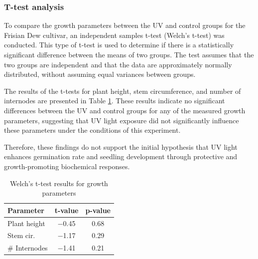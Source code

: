 \subsubsection{T-test analysis}

To compare the growth parameters between the UV and control groups for the Frisian Dew cultivar, an independent samples t-test (Welch's t-test) was conducted. This type of t-test is used to determine if there is a statistically significant difference between the means of two groups. The test assumes that the two groups are independent and that the data are approximately normally distributed, without assuming equal variances between groups.

The results of the t-tests for plant height, stem circumference, and number of internodes are presented in Table \ref{tab:ttest_results}. These results indicate no significant differences between the UV and control groups for any of the measured growth parameters, suggesting that UV light exposure did not significantly influence these parameters under the conditions of this experiment.

Therefore, these findings do not support the initial hypothesis that UV light enhances germination rate and seedling development through protective and growth-promoting biochemical responses.

\begin{table}[htbp]
    \caption{Welch's t-test results for growth parameters}
    \label{tab:ttest_results}
    \begin{tabularx}{\linewidth}{lcc}
        \toprule
        \textbf{Parameter} & \textbf{t-value} & \textbf{p-value} \\
        \midrule
        Plant height & \num[mode=text]{-0.45} & \num[mode=text]{0.68} \\
        Stem cir. & \num[mode=text]{-1.17} & \num[mode=text]{0.29} \\
        \# Internodes & \num[mode=text]{-1.41} & \num[mode=text]{0.21} \\
        \bottomrule
    \end{tabularx}
\end{table}

